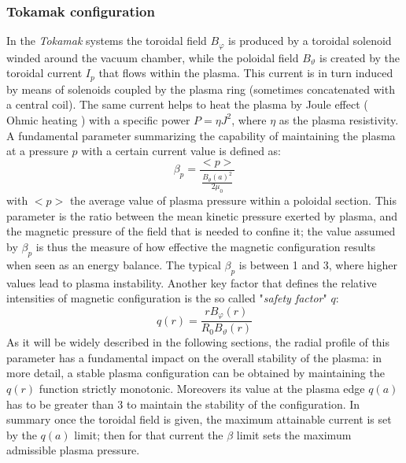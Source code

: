\subsubsection{Tokamak configuration}
In the \textit{Tokamak} systems the toroidal field $B_\varphi$ is produced by a toroidal solenoid winded around the vacuum chamber, while the poloidal field $B_\vartheta$ is created by the toroidal current $I_p$ that flows within the plasma. This current is in turn induced by means of solenoids coupled by the plasma ring (sometimes concatenated with a central coil). The same current helps to heat the plasma by Joule effect ( Ohmic heating ) with a specific power $P = \eta J^2$, where $\eta$ as the plasma resistivity.
%
A fundamental parameter summarizing the capability of maintaining the plasma at a pressure $p$ with a certain current value is defined as:
\begin{equation}
    \beta_p = \frac{<p>}{ \frac{B_{\theta}(a)^2}{2\mu_0} }
    \label{eq:magnetic_beta}
\end{equation}
with $<p>$ the average value of plasma pressure within a poloidal section. This parameter is the ratio between the mean kinetic pressure exerted by plasma, and the magnetic pressure of the field that is needed to confine it; the value assumed by $\beta_p$ is thus the measure of how effective the magnetic configuration results when seen as an energy balance. The typical $\beta_p$  is between 1 and 3, where higher values lead to plasma instability.
Another key factor that defines the relative intensities of magnetic configuration is the so called "\textit{safety factor}" $q$:
\begin{equation}
    q(r) = \frac{rB_\varphi(r)}{R_0B_\vartheta(r)}
\end{equation}
As it will be widely described in the following sections, the radial profile of this parameter has a fundamental impact on the overall stability of the plasma: in more detail, a stable plasma configuration can be obtained by maintaining the $q(r)$ function strictly monotonic. Moreovers its value at the plasma edge $q(a)$ has to be greater than 3 to maintain the stability of the configuration. 
In summary once the toroidal field is given, the maximum attainable current is set by the $q(a)$ limit; then for that current the $\beta$ limit sets the maximum admissible plasma pressure.
